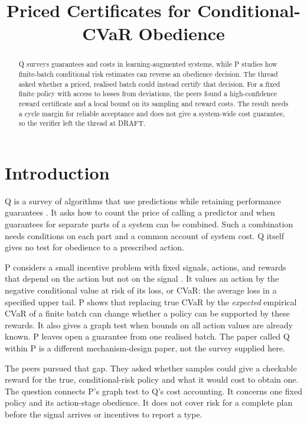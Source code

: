 \documentclass{article}
\title{Priced Certificates for Conditional-CVaR Obedience}
\begin{document}
\maketitle

\begin{abstract}
Q surveys guarantees and costs in learning-augmented systems, while P studies how finite-batch
conditional risk estimates can reverse an obedience decision. The thread asked whether a priced,
realised batch could instead certify that decision. For a fixed finite policy with access to losses
from deviations, the peers found a high-confidence reward certificate and a local bound on its
sampling and reward costs. The result needs a cycle margin for reliable acceptance and does not give
a system-wide cost guarantee, so the verifier left the thread at DRAFT.
\end{abstract}

\section{Introduction}

Q is a survey of algorithms that use predictions while retaining performance guarantees \cite{Q}. It
asks how to count the price of calling a predictor and when guarantees for separate parts of a
system can be combined. Such a combination needs conditions on each part and a common account of
system cost. Q itself gives no test for obedience to a prescribed action.

P considers a small incentive problem with fixed signals, actions, and rewards that depend on the
action but not on the signal \cite{P}. It values an action by the negative conditional value at risk
of its loss, or CVaR: the average loss in a specified upper tail. P shows that replacing true CVaR
by the \emph{expected} empirical CVaR of a finite batch can change whether a policy can be supported
by these rewards. It also gives a graph test when bounds on all action values are already known. P
leaves open a guarantee from one realised batch. The paper called Q within P is a different
mechanism-design paper, not the survey supplied here.

The peers pursued that gap. They asked whether samples could give a checkable reward for the true,
conditional-risk policy and what it would cost to obtain one. The question connects P's graph test
to Q's cost accounting. It concerns one fixed policy and its action-stage obedience. It does not
cover risk for a complete plan before the signal arrives or incentives to report a type.
\end{document}
